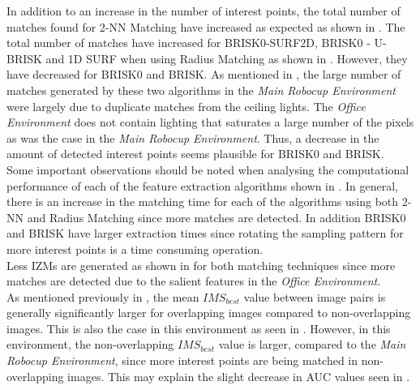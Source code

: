 In addition to an increase in the number of interest points, the total number of matches found for 2-NN Matching have increased as expected as shown in . The total number of matches have increased for BRISK0-SURF2D, BRISK0 - U-BRISK and 1D SURF when using Radius Matching as shown in . However, they have decreased for BRISK0 and BRISK. As mentioned in , the large number of matches generated by these two algorithms in the \textit{Main Robocup Environment} were largely due to duplicate matches from the ceiling lights. The \textit{Office Environment} does not contain lighting that saturates a large number of the pixels as was the case in the \textit{Main Robocup Environment}. Thus, a decrease in the amount of detected interest points seems plausible for BRISK0 and BRISK.\\


Some important observations should be noted when analysing the computational performance of each of the feature extraction algorithms shown in . In general, there is an increase in the matching time for each of the algorithms using both 2-NN and Radius Matching since more matches are detected. In addition BRISK0 and BRISK have larger extraction times since rotating the sampling pattern for more interest points is a time consuming operation.\\

Less IZMs are generated as shown in  for both matching techniques since more matches are detected due to the salient features in the \textit{Office Environment}. \\

As mentioned previously in , the mean $IMS_{best}$ value between image pairs is generally significantly larger for overlapping images compared to non-overlapping images. This is also the case in this environment as seen in . However, in this environment, the non-overlapping $IMS_{best}$ value is larger, compared to the \textit{Main Robocup Environment}, since more interest points are being matched in non-overlapping images. This may explain the slight decrease in AUC values seen in .\\




